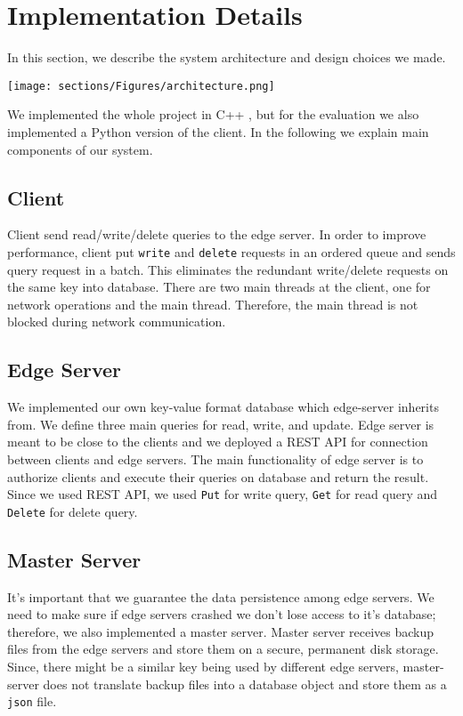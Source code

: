 \section{Implementation Details}
\label{sec:Solution}
In this section, we describe the system architecture and design choices we made. 

\begin{center}
 \texttt{[image: sections/Figures/architecture.png]}
\end{center}

We implemented the whole project in C++ \cite{prj_git}, but for the evaluation we also implemented a Python version of the client. In the following we explain main components of our system. 
\subsection{Client}
Client send read/write/delete queries to the edge server. In order to improve performance, client put \texttt{write} and \texttt{delete} requests in an ordered queue and sends query request in a batch. This eliminates the redundant write/delete requests on the same key into database. There are two main threads at the client, one for network operations and the main thread. Therefore, the main thread is not blocked during network communication. 

\subsection{Edge Server}
We implemented our own key-value format database which edge-server inherits from. We define three main queries for read, write, and update. Edge server is meant to be close to the clients and we deployed a REST API for connection between clients and edge servers. The main functionality of edge server is to authorize clients and execute their queries on database and return the result. Since we used REST API, we used \texttt{Put} for write query, \texttt{Get} for read query and \texttt{Delete} for delete query.


\subsection{Master Server}
It's important that we guarantee the data persistence among edge servers. We need to make sure if edge servers crashed we don't lose access to it's database; therefore, we also implemented a master server.
Master server receives backup files from the edge servers and store them on a secure, permanent disk storage. Since, there might be a similar key being used by different edge servers, master-server does not translate backup files into a database object and store them as a \texttt{json} file.
